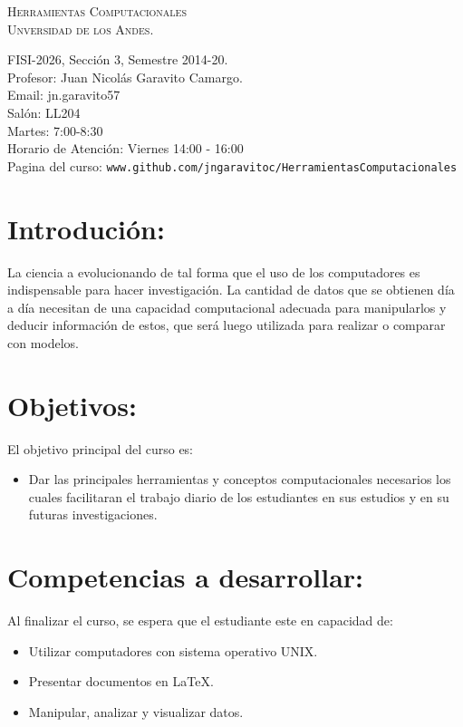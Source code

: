 \documentclass[letterpaper]{article}
\begin{document}
\begin{center}
\textsc{\LARGE Herramientas Computacionales}\\
\textsc{\large Unversidad de los Andes.}\\
\end{center}
\large{FISI-2026, Secci\'on 3, Semestre 2014-20.}\\
\large{Profesor: Juan Nicol\'as Garavito Camargo.}\\
\large{Email: jn.garavito57}\\
\large{Sal\'on: LL204}\\
\large{Martes: 7:00-8:30}\\
\large{Horario de Atenci\'on: Viernes 14:00 - 16:00}\\
\large{Pagina del curso: \verb"www.github.com/jngaravitoc/HerramientasComputacionales"}


\section*{Introduci\'on:}

La ciencia a evolucionando de tal forma que el uso de los computadores
es indispensable para hacer investigaci\'on. La cantidad de datos que se
obtienen d\'ia a d\'ia necesitan de una capacidad computacional adecuada
para manipularlos y deducir informaci\'on de estos, que ser\'a luego utilizada para
 realizar o comparar con modelos.


\section*{Objetivos:}

El objetivo principal del curso es:

\begin{itemize}
\item Dar las principales herramientas y conceptos computacionales necesarios
los cuales facilitaran el trabajo diario de los estudiantes en sus estudios y
en su futuras investigaciones.
\end{itemize}

\section*{Competencias a desarrollar:}

Al finalizar el curso, se espera que el estudiante este en capacidad de:

\begin{itemize}
\item Utilizar computadores con sistema operativo UNIX.
\item Presentar documentos en \LaTeX.
\item Manipular, analizar y visualizar datos.


\end{itemize}
\end{document}
